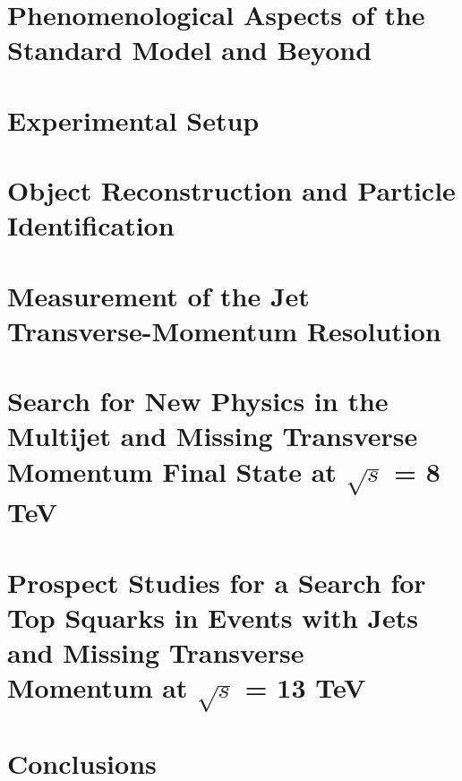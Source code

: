 \documentclass[
twoside=true,
BCOR10mm,
headsepline,     %
headings=normal,
open=right,
numbers=noenddot, %
a4paper
]{scrreprt} %
\begin{document}
\chapter{Phenomenological Aspects of the Standard Model and Beyond} \label{chap:Theory}


\chapter{Experimental Setup} \label{chap:Detector}


\chapter{Object Reconstruction and Particle Identification} \label{chap:Objects}


\chapter{Measurement of the Jet Transverse-Momentum Resolution} \label{chap:Resolution}


\chapter[Search for New Physics with Jets and Missing Transverse Momentum]{Search for New Physics in the Multijet and Missing Transverse Momentum Final State at $\sqrt{s}$ = 8 TeV} \label{chap:RA2}


\chapter[Prospect Studies for a Search for Top Squarks at $\sqrt{s}$ = 13 TeV]{Prospect Studies for a Search for Top Squarks in Events with Jets and Missing Transverse Momentum at $\sqrt{s}$ = 13 TeV} \label{chap:Stop}


\chapter{Conclusions} \label{chap:Conclusion}


\cleardoublepage

\appendix






\cleardoublepage
\thispagestyle{empty}
\chapter*{~}
%
\end{document}
